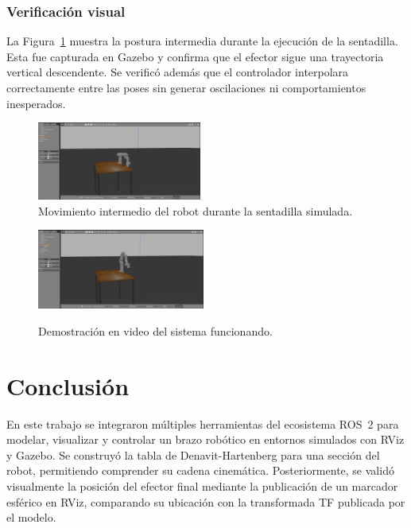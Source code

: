 \documentclass[conference]{IEEEtran}
\begin{document}
\subsubsection*{Verificación visual}

La Figura~\ref{fig:sentadilla} muestra la postura intermedia durante la ejecución de la sentadilla. Esta fue capturada en Gazebo y confirma que el efector sigue una trayectoria vertical descendente. Se verificó además que el controlador interpolara correctamente entre las poses sin generar oscilaciones ni comportamientos inesperados.

\begin{figure}[H]
    \centering
    \includegraphics[width=0.48\textwidth]{images/movimiento.png}
    \caption{Movimiento intermedio del robot durante la sentadilla simulada.}
    \label{fig:sentadilla}
\end{figure}

\begin{figure}[H]
    \centering
    \href{https://youtu.be/BZCWY3WiM1Q}{%
        \includegraphics[width=0.490\textwidth]{images/home.png}
    }
    \caption{Demostración en video del sistema funcionando.}
    \label{fig:video_demo}
\end{figure}

\section{Conclusión}

En este trabajo se integraron múltiples herramientas del ecosistema ROS~2 para modelar, visualizar y controlar un brazo robótico en entornos simulados con RViz y Gazebo. Se construyó la tabla de Denavit-Hartenberg para una sección del robot, permitiendo comprender su cadena cinemática. Posteriormente, se validó visualmente la posición del efector final mediante la publicación de un marcador esférico en RViz, comparando su ubicación con la transformada TF publicada por el modelo.
\end{document}
